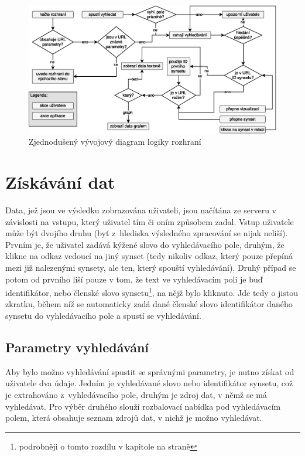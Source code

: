 \documentclass[a4paper, 11pt, oneside, showtrims]{book}
\newcommand{\itNameRef}[1]{\textit{\nameref{#1}}}
\begin{document}
			\begin{figure}[h]
				\centering
				\includegraphics[width=1.0\textwidth]{wordnet-ui-diag_v2.eps}
				\caption{Zjednodušený vývojový diagram logiky rozhraní}
				\label{fig:wordnet-ui-diag}
			\end{figure}

			\section{Získávání dat}
				
				Data, jež jsou ve výsledku zobrazována uživateli, jsou načítána ze serveru v závislosti na vstupu, který uživatel tím či oním způsobem zadal. Vstup uživatele může být dvojího druhu (byť z~hlediska výsledného zpracování se nijak neliší). Prvním je, že uživatel zadává kýžené slovo do vyhledávacího pole, druhým, že klikne na odkaz vedoucí na jiný synset (tedy nikoliv odkaz, který pouze přepíná mezi již nalezenými synsety, ale ten, který spouští vyhledávání). Druhý případ se potom od prvního liší pouze v tom, že text ve vyhledávacím poli je buď identifikátor, nebo členské slovo synsetu\footnote{podrobněji o tomto rozdílu v kapitole \itNameRef{cha:textovarepres} na straně \pageref{cha:textovarepres}}, na nějž bylo kliknuto. Jde tedy o jistou zkratku, během níž se automaticky zadá dané členské slovo identifikátor daného synsetu do vyhledávacího pole a spustí se vyhledávání.

				\subsection{Parametry vyhledávání}
				
					Aby bylo možno vyhledávání spustit se správnými parametry, je nutno získat od uživatele dva údaje. Jedním je vyhledávané slovo nebo identifikátor synsetu, což je extrahováno z~vyhledávacího pole, druhým je zdroj dat, v němž se má vyhledávat. Pro výběr druhého slouží rozbalovací nabídka pod vyhledávacím polem, která obsahuje seznam zdrojů dat, v nichž je možno vyhledávat.
\end{document}
